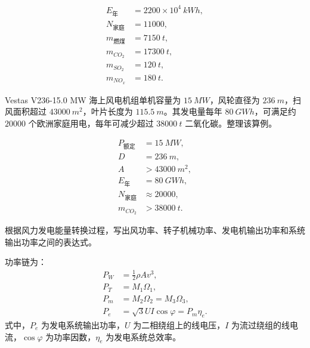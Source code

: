 \begin{solution}
\begin{equation*}
\begin{aligned}
E_{\text{年}} &= 2200 \times 10^4\ \unit{kWh},\\
N_{\text{家庭}} &= \num{11000},\\
m_{\text{燃煤}} &= \qty{7150}{t},\\
m_{CO_2} &= \qty{17300}{t},\\
m_{SO_2} &= \qty{120}{t},\\
m_{NO_x} &= \qty{180}{t}.
\end{aligned}
\end{equation*}
\end{solution}

\begin{problem}[V236-15.0 MW 机组年发电量与减排量]\label{exer:calc_03_wind_p041_01}
Vestas V236-15.0 MW 海上风电机组单机容量为 \(\qty{15}{MW}\)，风轮直径为 \(\qty{236}{m}\)，扫风面积超过 \(\qty{43000}{m^2}\)，叶片长度为 \(\qty{115.5}{m}\)。其发电量每年 \(\qty{80}{GWh}\)，可满足约 \(\num{20000}\) 个欧洲家庭用电，每年可减少超过 \(\qty{38000}{t}\) 二氧化碳。整理该算例。
\end{problem}

\begin{solution}
\begin{equation*}
\begin{aligned}
P_{\text{额定}} &= \qty{15}{MW},\\
D &= \qty{236}{m},\\
A &> \qty{43000}{m^2},\\
E_{\text{年}} &= \qty{80}{GWh},\\
N_{\text{家庭}} &\approx \num{20000},\\
m_{CO_2} &> \qty{38000}{t}.
\end{aligned}
\end{equation*}
\end{solution}

\begin{problem}[风力发电系统输出功率链]\label{exer:calc_03_wind_p060_01}
根据风力发电能量转换过程，写出风功率、转子机械功率、发电机输出功率和系统输出功率之间的表达式。
\end{problem}

\begin{solution}
功率链为：
\begin{equation*}
\begin{aligned}
P_W &= \frac{1}{2}\rho A v^3,\\
P_T &= M_1\Omega_1,\\
P_m &= M_2\Omega_2 = M_3\Omega_3,\\
P_e &= \sqrt{3}UI\cos\varphi = P_m\eta_e.
\end{aligned}
\end{equation*}
式中，\(P_e\) 为发电系统输出功率，\(U\) 为二相绕组上的线电压，\(I\) 为流过绕组的线电流，\(\cos\varphi\) 为功率因数，\(\eta_e\) 为发电系统总效率。
\end{solution}

